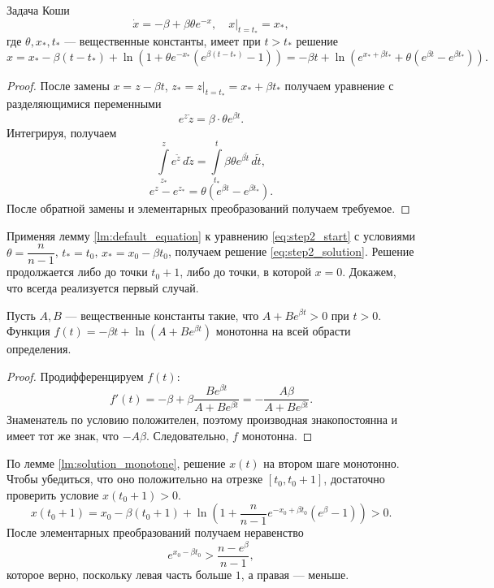 \begin{lemma}
	\label{lm:default_equation}
	Задача Коши 
	\[
	\dot{x} = -\beta + \beta \theta e^{-x}, \quad x \vert_{t = t_*} = x_*,
	\]
	где $\theta, x_*, t_*$ --- вещественные константы, имеет при $t > t_*$ решение 
	\[
	x = x_* - \beta (t - t_*) + \ln\left(1 + \theta e^{-x_*} (e^{\beta(t - t_*)} - 1)\right) =
	-\beta t + \ln\left(e^{x_* + \beta t_*} + \theta (e^{\beta t} - e^{\beta t_*})\right).
	\]
\end{lemma}

\begin{proof}
	После замены $x = z - \beta t$, $z_* = z \vert_{t = t_*} = x_* + \beta t_*$ получаем уравнение с разделяющимися переменными
	\[
	e^{z} \dot{z} = \beta \cdot \theta e^{\beta t}.
	\]
	Интегрируя, получаем
	\[
	\int\limits_{z_*}^z e^{\tilde{z}} \, d\tilde{z} = \int\limits_{t_*}^{t} \beta \theta e^{\beta \tilde{t}}\,d\tilde{t},
	\]
	\[
	e^z - e^{z_*} = \theta (e^{\beta t} - e^{\beta t_*}).
	\]
	После обратной замены и элементарных преобразований получаем требуемое.
\end{proof}

Применяя лемму \ref{lm:default_equation} к уравнению \eqref{eq:step2_start} с условиями $\theta = \dfrac{n}{n - 1}$, $t_* = t_0$, $x_* = x_0 - \beta t_0$, получаем решение \eqref{eq:step2_solution}. Решение продолжается либо до точки $t_0 + 1$, либо до точки, в которой $x = 0$. Докажем, что всегда реализуется первый случай.

\begin{lemma}
	\label{lm:solution_monotone}
	Пусть $A, B$ --- вещественные константы такие, что $A + B e^{\beta t} > 0$ при $t > 0$. Функция $f(t) = -\beta t + \ln\left(A + B e^{\beta t}\right)$ монотонна на всей обрасти определения.
\end{lemma}
\begin{proof}
	Продифференцируем $f(t)$:
	\[
	f'(t) = -\beta + \beta \dfrac{B e^{\beta t}}{A + B e^{\beta t}} = -\dfrac{A \beta}{A + B e^{\beta t}}.
	\]
	Знаменатель по условию положителен, поэтому производная знакопостоянна и имеет тот же знак, что $-A \beta$. Следовательно, $f$ монотонна.
\end{proof}

По лемме \ref{lm:solution_monotone}, решение $x(t)$ на втором шаге монотонно. Чтобы убедиться, что оно положительно на отрезке $[t_0, t_0 + 1]$, достаточно проверить условие $x(t_0 + 1) > 0$.
%
\[
x(t_0 + 1) = x_0 - \beta (t_0 + 1) + \ln\left(1 + \frac{n}{n - 1}e^{-x_0 + \beta t_0} (e^{\beta} - 1)\right) > 0.
\]
%
После элементарных преобразований получаем неравенство
\[
e^{x_0 - \beta t_0} > \dfrac{n - e^\beta}{n - 1},
\]
которое верно, поскольку левая часть больше $1$, а правая --- меньше.

